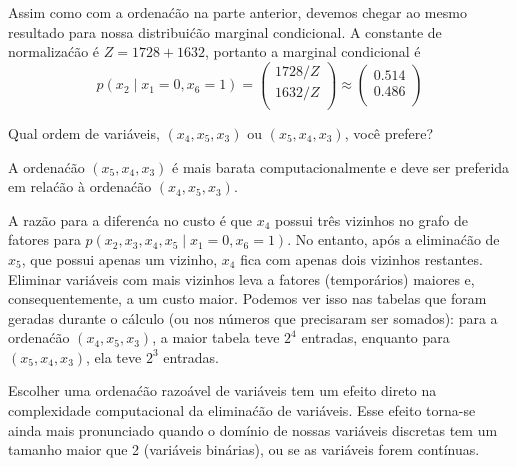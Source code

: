 \begin{exenumerate}
\begin{solution}
        Assim como com a ordena\'c\~ao na parte anterior, devemos chegar ao
        mesmo resultado para nossa distribui\'c\~ao marginal condicional. A
        constante de normaliza\'c\~ao \'e $Z = 1728 + 1632$, portanto a
        marginal condicional \'e
        \begin{equation}
            p(x_2 \mid x_1=0, x_6=1) = 
            \begin{pmatrix}
                1728 / Z \\
                1632 / Z \\
            \end{pmatrix} \approx 
            \begin{pmatrix}
                0.514 \\
                0.486 \\
            \end{pmatrix}
        \end{equation}
        
    \end{solution}
    
    \item Qual ordem de vari\'aveis, $(x_4, x_5, x_3)$ ou $(x_5, x_4, x_3)$, voc\^e prefere?
    
    \begin{solution}
        A ordena\'c\~ao $(x_5, x_4, x_3)$ \'e mais barata computacionalmente e deve ser preferida
        em rela\'c\~ao \`a ordena\'c\~ao $(x_4, x_5, x_3)$.
        
        A raz\~ao para a diferen\'ca no custo \'e que $x_4$ possui tr\^es
        vizinhos no grafo de fatores para $p(x_2, x_3, x_4, x_5 \mid
        x_1=0, x_6=1)$. No entanto, ap\'os a elimina\'c\~ao de $x_5$, que possui
        apenas um vizinho, $x_4$ fica com apenas dois vizinhos restantes. 
        Eliminar vari\'aveis com mais vizinhos leva a
        fatores (tempor\'arios) maiores e, consequentemente, a um custo maior. Podemos ver
        isso nas tabelas que foram geradas durante o c\'alculo (ou nos n\'umeros
        que precisaram ser somados): para a ordena\'c\~ao $(x_4, x_5, x_3)$, a maior tabela teve $2^4$ entradas, enquanto para $(x_5, x_4, x_3)$, ela teve $2^3$ entradas.
        
        Escolher uma ordena\'c\~ao razo\'avel de vari\'aveis tem um efeito direto na
        complexidade computacional da elimina\'c\~ao de vari\'aveis. Esse efeito
        torna-se ainda mais pronunciado quando o dom\'inio de nossas vari\'aveis discretas
        tem um tamanho maior que 2 (vari\'aveis bin\'arias), ou se as
        vari\'aveis forem cont\'inuas.
        

\end{solution}
\end{exenumerate}
